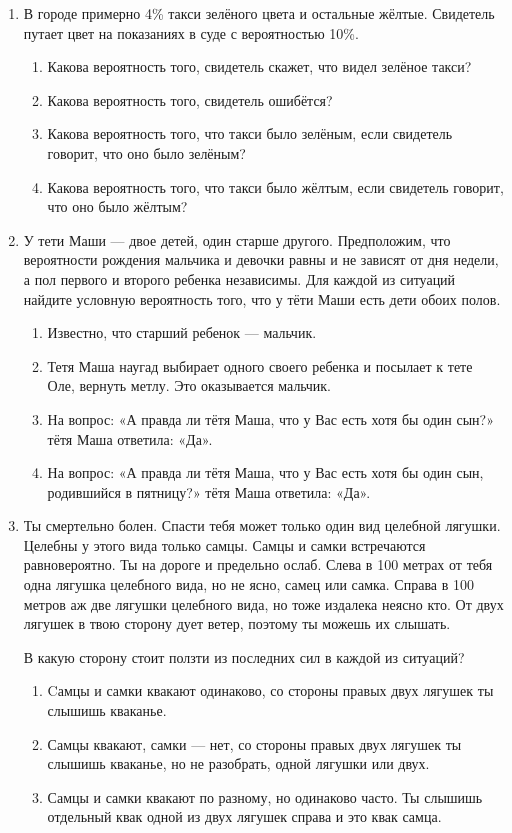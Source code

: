 \documentclass[a4paper, 12pt]{article}
\begin{document}
\newpage
\begin{enumerate}

\item  В городе примерно 4\% такси зелёного цвета и остальные жёлтые. Свидетель путает цвет на показаниях в суде с вероятностью 10\%.

\begin{enumerate}
\item Какова вероятность того, свидетель скажет, что видел зелёное такси?
\item Какова вероятность того, свидетель ошибётся?
\item Какова вероятность того, что такси было зелёным, если свидетель говорит, что оно было зелёным?
\item Какова вероятность того, что такси было жёлтым, если свидетель говорит, что оно было жёлтым?
\end{enumerate}


\item У тети Маши — двое детей, один старше другого. Предположим, что вероятности рождения мальчика и девочки равны и не зависят от дня недели, а пол первого и второго ребенка независимы. Для каждой из ситуаций найдите условную вероятность того, что у тёти Маши есть дети обоих полов.
\begin{enumerate}
\item Известно, что старший ребенок — мальчик.
\item Тетя Маша наугад выбирает одного своего
ребенка и посылает к тете Оле, вернуть метлу. Это оказывается мальчик.
\item На вопрос: «А правда ли тётя Маша, что у Вас есть хотя бы один сын?» тётя Маша ответила: «Да».
\item На вопрос: «А правда ли тётя Маша, что у Вас есть хотя бы один сын, родившийся в пятницу?» тётя Маша ответила: «Да».
\end{enumerate}

\item Ты смертельно болен. Спасти тебя может только один вид  целебной лягушки. Целебны у этого вида только самцы. Самцы и самки встречаются равновероятно. Ты на дороге и предельно ослаб. Слева в 100 метрах от тебя одна лягушка целебного вида, но не ясно, самец или самка. Справа в 100 метров аж две лягушки целебного вида, но тоже издалека неясно кто. От двух лягушек в твою сторону дует ветер, поэтому ты можешь их слышать.

В какую сторону стоит ползти из последних сил в каждой из  ситуаций?
\begin{enumerate}
  \item Cамцы и самки квакают одинаково, со стороны правых двух лягушек ты слышишь кваканье.
  \item Самцы квакают, самки — нет, со стороны правых двух лягушек ты слышишь кваканье, но не разобрать, одной лягушки или двух.
  \item Самцы и самки квакают по разному, но одинаково часто. Ты слышишь отдельный квак одной из двух лягушек справа и это квак самца.
\end{enumerate}


\end{enumerate}
\end{document}
